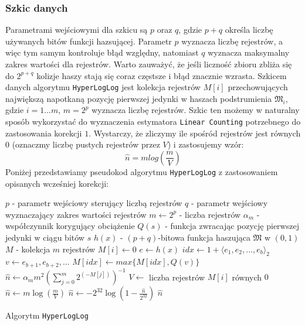 \subsubsection{Szkic danych}
\label{HLL_sketch}
Parametrami wejściowymi dla szkicu są $p$ oraz $q$, gdzie $p + q$ określa liczbę używanych bitów funkcji hazsującej. Parametr $p$ wyznacza liczbę rejestrów, a więc tym samym kontroluje błąd względny, natomiast $q$ wyznacza maksymalny zakres wartości dla rejestrów. Warto zauważyć, że jeśli liczność zbioru zbliża się do $2^{p+q}$ kolizje haszy stają się coraz częstsze i błąd znacznie wzrasta. 
Szkicem danych algorytmu \texttt{HyperLogLog} jest kolekcja rejestrów $M[i]$ przechowujących największą napotkaną pozycję pierwszej jedynki w haszach podstrumienia $\mathfrak{M}_i$, gdzie $i = 1 ... m$, $m = 2^p$ wyznacza liczbę rejestrów. Szkic ten możemy w naturalny sposób wykorzystać do wyznaczenia estymatora \texttt{Linear Counting} potrzebnego do zastosowania korekcji $1.$  Wystarczy, że zliczymy ile spośród rejestrów jest równych $0$ (oznaczmy liczbę pustych rejestrów przez $V$) i zastosujemy wzór:
\begin{equation}
	\hat{n} = {m}log(\frac{m}{V})
\end{equation}
 Poniżej przedstawiamy pseudokod algorytmu \texttt{HyperLogLog} z zastosowaniem opisanych wcześniej korekcji:
\newline
\begin{algorithm}
    \begin{algorithmic}
    \State $p $ - parametr wejściowy sterujący liczbą rejestrów
    \State $q $ - parametr wejściowy wyznaczający zakres wartości rejestrów
    \State $m \gets 2^p$ - liczba rejestrów
    \State ${\alpha}_m $ - współczynnik korygujący obciążenie
    \State $Q(s) $ -  funkcja zwracając pozycję pierwszej jedynki w ciągu bitów $s$ 
    \State $h(x)  $  - $(p + q)$-bitowa funkcja haszująca $\mathfrak{M}$ w $(0, 1)$
    \State $M $  - kolekcja $m$ rejestrów 
    \newline
        \State $M[i] \gets 0$
    \EndFor
    \newline
        \State $e \gets h(x)$
        \State $idx \gets 1 + {{\langle}e_1, e_2, ..., e_b{\rangle}}_2$
        \State $v \gets e_{b+1}, e_{b+2}, ...$
        \State $M[idx] \gets max\{M[idx], Q(v)\}$
    \EndFunction
    \newline
        \State $\hat{n} \gets {\alpha}_{m}{m}^2(\sum_{j=0}^{m} 2^{(-M[j])})^{-1}$
            \State $V \gets $ liczba rejestrów $M[i]$ równych $0$
                \State $\hat{n} \gets {m}\log(\frac{m}{V})$
            \EndIf
            \State $\hat{n} \gets -2^{32}\log(1 - \frac{\hat{n}}{2^{32}})$
        \EndIf
        \State \Return $\hat{n}$
    \EndFunction
    
    \end{algorithmic}
    \caption{Algorytm \texttt{HyperLogLog}}
\end{algorithm}


